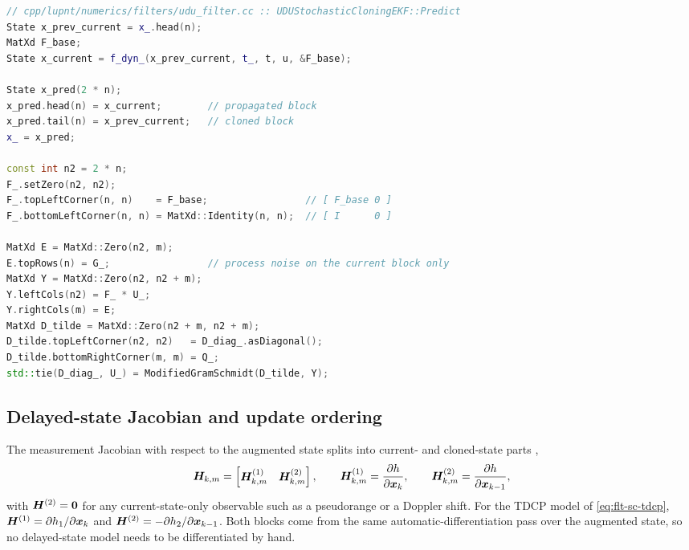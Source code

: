 \begin{lstlisting}[language=cpp, caption={Augmented STM assembly and MWGS time update.},
                   label={lst:flt-sc-predict}]
// cpp/lupnt/numerics/filters/udu_filter.cc :: UDUStochasticCloningEKF::Predict
State x_prev_current = x_.head(n);
MatXd F_base;
State x_current = f_dyn_(x_prev_current, t_, t, u, &F_base);

State x_pred(2 * n);
x_pred.head(n) = x_current;        // propagated block
x_pred.tail(n) = x_prev_current;   // cloned block
x_ = x_pred;

const int n2 = 2 * n;
F_.setZero(n2, n2);
F_.topLeftCorner(n, n)    = F_base;                 // [ F_base 0 ]
F_.bottomLeftCorner(n, n) = MatXd::Identity(n, n);  // [ I      0 ]

MatXd E = MatXd::Zero(n2, m);
E.topRows(n) = G_;                 // process noise on the current block only
MatXd Y = MatXd::Zero(n2, n2 + m);
Y.leftCols(n2) = F_ * U_;
Y.rightCols(m) = E;
MatXd D_tilde = MatXd::Zero(n2 + m, n2 + m);
D_tilde.topLeftCorner(n2, n2)   = D_diag_.asDiagonal();
D_tilde.bottomRightCorner(m, m) = Q_;
std::tie(D_diag_, U_) = ModifiedGramSchmidt(D_tilde, Y);
\end{lstlisting}

\subsection{Delayed-state Jacobian and update ordering}

The measurement Jacobian with respect to the augmented state splits into
current- and cloned-state parts
\citep[Ch.~6.2.3, Eq.~6.25]{iiyama2026thesis},
\begin{equation}
  \label{eq:flt-sc-jac}
  \bm{H}_{k,m}
  = \begin{bmatrix} \bm{H}^{(1)}_{k,m} & \bm{H}^{(2)}_{k,m} \end{bmatrix},
  \qquad
  \bm{H}^{(1)}_{k,m} = \frac{\partial h}{\partial \bm{x}_{k}},
  \qquad
  \bm{H}^{(2)}_{k,m} = \frac{\partial h}{\partial \bm{x}_{k-1}} ,
\end{equation}
with $\bm{H}^{(2)} = \bm{0}$ for any current-state-only observable such as a
pseudorange or a Doppler shift. For the TDCP model of \cref{eq:flt-sc-tdcp},
$\bm{H}^{(1)} = \partial h_1/\partial \bm{x}_k$ and
$\bm{H}^{(2)} = -\partial h_2/\partial \bm{x}_{k-1}$. Both blocks come from
the same automatic-differentiation pass over the augmented state, so no
delayed-state model needs to be differentiated by hand.

